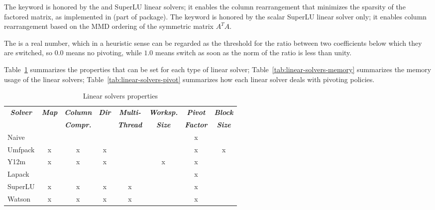 The keyword  is honored by the  and SuperLU linear solvers;
it enables the column rearrangement that minimizes the sparsity
of the factored matrix, as implemented in 
(part of  package). The keyword  is honored by 
the scalar SuperLU linear solver only; it enables column rearrangement
based on the MMD ordering of the symmetric matrix $A^T A$.


The  is a real number, which in a heuristic sense 
can be regarded as the threshold for the ratio between two coefficients 
below which they are switched, so $ 0.0 $ means no pivoting, 
while $ 1.0 $ means switch as soon as the norm of the ratio 
is less than unity.

Table~\ref{tab:linear-solvers-props} summarizes the properties that can be set
for each type of linear solver; Table~\ref{tab:linear-solvers-memory}
summarizes  the memory usage of the linear solvers;
Table~\ref{tab:linear-solvers-pivot}
summarizes how each linear solver deals with pivoting policies.

\begin{table}
\centering
\caption{Linear solvers properties}\label{tab:linear-solvers-props}
\begin{tabular}{lccccccc}
\hline
	\multicolumn{1}{c}{\textbf{\emph{Solver}}} &
	\multicolumn{1}{c}{\textbf{\emph{Map}}} &
	\multicolumn{1}{c}{\textbf{\emph{Column}}} &
	\multicolumn{1}{c}{\textbf{\emph{Dir}}} &
	\multicolumn{1}{c}{\textbf{\emph{Multi-}}} &
	\multicolumn{1}{c}{\textbf{\emph{Worksp.}}} &
	\multicolumn{1}{c}{\textbf{\emph{Pivot}}} &
	\multicolumn{1}{c}{\textbf{\emph{Block}}} \\
	& & \multicolumn{1}{c}{\textbf{\emph{Compr.}}} &
	& \multicolumn{1}{c}{\textbf{\emph{Thread}}}
	& \multicolumn{1}{c}{\textbf{\emph{Size}}}
	& \multicolumn{1}{c}{\textbf{\emph{Factor}}}
	& \multicolumn{1}{c}{\textbf{\emph{Size}}} \\
\hline\hline
	Naive		& 	&	&	&	&	& x	&	\\
	Umfpack		& x	& x	& x	&	&	& x	& x	\\
	Y12m		& x	& x	& x	&	& x	& x	&	\\
	Lapack		&	&	&	&	&	& x	&	\\
	SuperLU		& x	& x	& x	& x	&	& x	&	\\
	Watson		& x	& x	& x	& x	&	& x	&	\\
\hline
\end{tabular}
\end{table}


